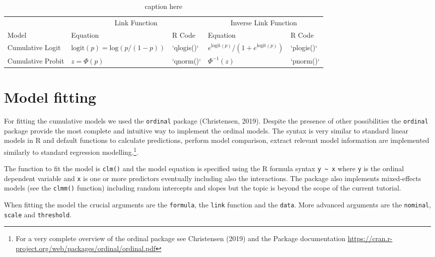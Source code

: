 \documentclass[
  man,floatsintext]{apa6}
\begin{document}
\scriptsize

\begin{table}

\caption{\label{tab:tab-model-summary}caption here}
\centering
\begin{tabular}[t]{lllll}
\toprule
\multicolumn{1}{c}{} & \multicolumn{2}{c}{Link Function} & \multicolumn{2}{c}{Inverse Link Function} \\
\cmidrule(l{3pt}r{3pt}){2-3} \cmidrule(l{3pt}r{3pt}){4-5}
Model & Equation & R Code & Equation & R Code\\
\midrule
Cumulative Logit & $\text{logit}(p) = \text{log}(p / (1-p))$ & `qlogis()` & $e^{\text{logit}(p)} / (1 + e^{\text{logit}(p)})$ & `plogis()`\\
Cumulative Probit & $z = \Phi(p)$ & `qnorm()` & $\Phi^{-1}(z)$ & `pnorm()`\\
\bottomrule
\end{tabular}
\end{table}

\normalsize

\section{Model fitting}\label{model-fitting}

For fitting the cumulative models we used the \texttt{ordinal} package (Christensen, 2019). Despite the presence of other possibilities the \texttt{ordinal} package provide the most complete and intuitive way to implement the ordinal models. The syntax is very similar to standard linear models in R and default functions to calculate predictions, perform model comparison, extract relevant model information are implemented similarly to standard regression modelling.\footnote{For a very complete overview of the ordinal package see Christensen (2019) and the Package documentation \url{https://cran.r-project.org/web/packages/ordinal/ordinal.pdf}}.

The function to fit the model is \texttt{clm()} and the model equation is specified using the R formula syntax \texttt{y\ \textasciitilde{}\ x} where \texttt{y} is the ordinal dependent variable and \texttt{x} is one or more predictors eventually including also the interactions. The package also implements mixed-effects models (see the \texttt{clmm()} function) including random intercepts and slopes but the topic is beyond the scope of the current tutorial.

When fitting the model the crucial arguments are the \texttt{formula}, the \texttt{link} function and the \texttt{data}. More advanced arguments are the \texttt{nominal}, \texttt{scale} and \texttt{threshold}.
\end{document}
